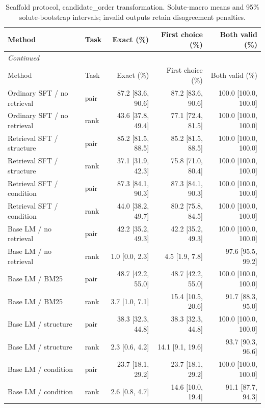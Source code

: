 \begingroup\footnotesize
\setlength{\tabcolsep}{3pt}
\begin{longtable}{p{.26\linewidth}lrrr}
\caption{Scaffold protocol, candidate\_order transformation. Solute-macro means and 95\% solute-bootstrap intervals; invalid outputs retain disagreement penalties.}\label{tab:consistency-scaffold-candidate-order}\\
\toprule
Method & Task & Exact (\%) & First choice (\%) & Both valid (\%) \\
\midrule
\endfirsthead
\multicolumn{5}{l}{\textit{Continued}} \\
\toprule
Method & Task & Exact (\%) & First choice (\%) & Both valid (\%) \\
\midrule
\endhead
Ordinary SFT / no retrieval & pair & 87.2 [83.6, 90.6] & 87.2 [83.6, 90.6] & 100.0 [100.0, 100.0] \\
Ordinary SFT / no retrieval & rank & 43.6 [37.8, 49.4] & 77.1 [72.4, 81.5] & 100.0 [100.0, 100.0] \\
Retrieval SFT / structure & pair & 85.2 [81.5, 88.5] & 85.2 [81.5, 88.5] & 100.0 [100.0, 100.0] \\
Retrieval SFT / structure & rank & 37.1 [31.9, 42.3] & 75.8 [71.0, 80.4] & 100.0 [100.0, 100.0] \\
Retrieval SFT / condition & pair & 87.3 [84.1, 90.3] & 87.3 [84.1, 90.3] & 100.0 [100.0, 100.0] \\
Retrieval SFT / condition & rank & 44.0 [38.2, 49.7] & 80.2 [75.8, 84.5] & 100.0 [100.0, 100.0] \\
Base LM / no retrieval & pair & 42.2 [35.2, 49.3] & 42.2 [35.2, 49.3] & 100.0 [100.0, 100.0] \\
Base LM / no retrieval & rank & 1.0 [0.0, 2.3] & 4.5 [1.9, 7.8] & 97.6 [95.5, 99.2] \\
Base LM / BM25 & pair & 48.7 [42.2, 55.0] & 48.7 [42.2, 55.0] & 100.0 [100.0, 100.0] \\
Base LM / BM25 & rank & 3.7 [1.0, 7.1] & 15.4 [10.5, 20.6] & 91.7 [88.3, 95.0] \\
Base LM / structure & pair & 38.3 [32.3, 44.8] & 38.3 [32.3, 44.8] & 100.0 [100.0, 100.0] \\
Base LM / structure & rank & 2.3 [0.6, 4.2] & 14.1 [9.1, 19.6] & 93.7 [90.3, 96.6] \\
Base LM / condition & pair & 23.7 [18.1, 29.2] & 23.7 [18.1, 29.2] & 100.0 [100.0, 100.0] \\
Base LM / condition & rank & 2.6 [0.8, 4.7] & 14.6 [10.0, 19.4] & 91.1 [87.7, 94.3] \\

\end{longtable}
